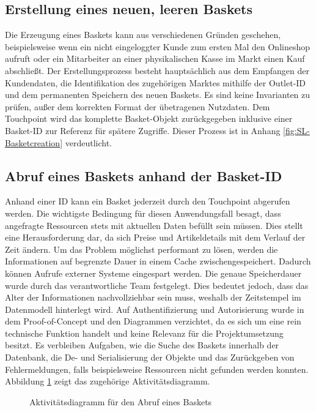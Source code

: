 \subsection{Erstellung eines neuen, leeren Baskets}

Die Erzeugung eines Baskets kann aus verschiedenen Gründen geschehen, beispielsweise wenn ein nicht eingeloggter Kunde zum ersten Mal den Onlineshop aufruft oder ein Mitarbeiter an einer physikalischen Kasse im Markt einen Kauf abschließt. Der Erstellungsprozess besteht hauptsächlich aus dem Empfangen der Kundendaten, die Identifikation des zugehörigen Marktes mithilfe der Outlet-ID und dem permanenten Speichern des neuen Baskets. Es sind keine Invarianten zu prüfen, außer dem korrekten Format der übetragenen Nutzdaten. Dem Touchpoint wird das komplette Basket-Objekt zurückgegeben inklusive einer Basket-ID zur Referenz für spätere Zugriffe. Dieser Prozess ist in Anhang \ref{fig:SL-Basketcreation} verdeutlicht. 

\subsection{Abruf eines Baskets anhand der Basket-ID}

Anhand einer ID kann ein Basket jederzeit durch den Touchpoint abgerufen werden. Die wichtigste Bedingung für diesen Anwendungsfall besagt, dass angefragte Ressourcen stets mit aktuellen Daten befüllt sein müssen. Dies stellt eine Herausforderung dar, da sich Preise und Artikeldetails mit dem Verlauf der Zeit ändern. Um das Problem möglichst performant zu lösen, werden die Informationen auf begrenzte Dauer in einem Cache zwischengespeichert. Dadurch können Aufrufe externer Systeme eingespart werden. Die genaue Speicherdauer wurde durch das verantwortliche Team festgelegt. Dies bedeutet jedoch, dass das Alter der Informationen nachvollziehbar sein muss, weshalb der Zeitstempel im Datenmodell hinterlegt wird. Auf Authentifizierung und Autorisierung wurde in dem Proof-of-Concept und den Diagrammen verzichtet, da es sich um eine rein technische Funktion handelt und keine Relevanz für die Projektumsetzung besitzt. Es verbleiben Aufgaben, wie die Suche des Baskets innerhalb der Datenbank, die De- und Serialisierung der Objekte und das Zurückgeben von Fehlermeldungen, falls beispielsweise Ressourcen nicht gefunden werden konnten. Abbildung \ref{fig:SL-Basketabruf} zeigt das zugehörige Aktivitätsdiagramm.

\begin{figure}[h!]
	\centering
	
	\caption{Aktivitätsdiagramm für den Abruf eines Baskets}
	\label{fig:SL-Basketabruf}
\end{figure}

